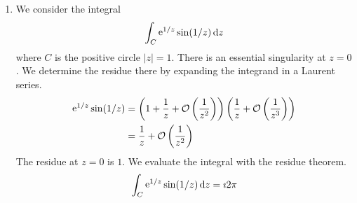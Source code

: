 {\begin{Solution}
\begin{enumerate}
\[    \]
    where $C$ is the positive circle $|z| = 3$.
    There is a second order pole at $z = 0$, and first order poles at $z = 2$
    and $z = - \imath 5$.  The poles at $z = 0$ and $z = 2$ lie inside the contour.
    We evaluate the integral with Cauchy's residue theorem.
    \begin{align*}
      \int_C \frac{\e^{\imath z}}{z^2 (z - 2) (z + \imath 5)}\,\dd z
      &= \imath 2 \pi \bigg( 
      \Res \left(\frac{\e^{\imath z}}{z^2 (z - 2) (z + \imath 5)}, z = 0 \right)
      \\
      &\qquad + \Res \left(\frac{\e^{\imath z}}{z^2 (z - 2) (z + \imath 5)}, z = 2 \right) 
      \bigg)
      \\
      &= \imath 2 \pi \left( 
        \left. \frac{\dd}{\dd z} \frac{\e^{\imath z}}{(z - 2) (z + \imath 5)} \right|_{z = 0}
        + \left. \frac{\e^{\imath z}}{z^2 (z + \imath 5)} \right|_{z = 2} \right)
      \\
      &= \imath 2 \pi \left( 
        \left. \frac{\dd}{\dd z} \frac{\e^{\imath z}}{(z - 2) (z + \imath 5)} \right|_{z = 0}
        + \left. \frac{\e^{\imath z}}{z^2 (z + \imath 5)} \right|_{z = 2} \right)
      \\
      &= \imath 2 \pi \left( 
        \left. \frac{ \imath \left( z^2 + (\imath 7 - 2) z - 5 - \imath 12 \right) \e^{\imath z} }
          { (z - 2)^2 (z + \imath 5)^2 } \right|_{z = 0}
        + \left( \frac{1}{58} - \imath \frac{5}{116} \right) \e^{\imath 2}
      \right)
      \\
      &= \imath 2 \pi \left( 
        - \frac{3}{25} + \frac{\imath}{20}
        + \left( \frac{1}{58} - \imath \frac{5}{116} \right) \e^{\imath 2}
      \right)
      \\
      &= - \frac{\pi}{10} + \frac{5}{58} \pi \cos 2 - \frac{1}{29} \pi \sin 2
      + \imath \left( - \frac{6 \pi}{25} + \frac{1}{29} \pi \cos 2 
        + \frac{5}{58} \pi \sin 2 \right)
    \end{align*}
  \item 
    We consider the integral
    \[
    \int_C \mathop{\mathrm{e}}\nolimits^{1/z} \sin(1/z)\,\mathrm{d} z
    \]
    where $C$ is the positive circle $|z| = 1$.  There is an essential 
    singularity at $z = 0$.  We determine the residue there by expanding 
    the integrand in a Laurent series.
    \begin{align*}
      \mathop{\mathrm{e}}\nolimits^{1/z} \sin(1/z)
      &= \left( 1 + \frac{1}{z} +  \mathcal{O} \left( \frac{1}{z^2} \right)
      \right)
      \left( \frac{1}{z} + \mathcal{O} \left( \frac{1}{z^3} \right) \right)
      \\
      &= \frac{1}{z} + \mathcal{O} \left( \frac{1}{z^2} \right)
    \end{align*}
    The residue at $z = 0$ is $1$.  We evaluate the integral with the residue
    theorem.
    \[
    \int_C \mathop{\mathrm{e}}\nolimits^{1/z} \sin(1/z)\,\mathrm{d} z = \imath 2 \pi
    \]
  \end{enumerate}
\end{Solution}











}
